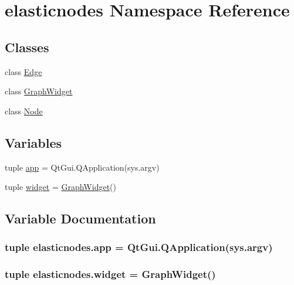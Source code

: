 \hypertarget{namespaceelasticnodes}{}\section{elasticnodes Namespace Reference}
\label{namespaceelasticnodes}
\subsection*{Classes}
\begin{DoxyCompactItemize}
\item 
class \hyperlink{classelasticnodes_1_1Edge}{Edge}
\item 
class \hyperlink{classelasticnodes_1_1GraphWidget}{Graph\+Widget}
\item 
class \hyperlink{classelasticnodes_1_1Node}{Node}
\end{DoxyCompactItemize}
\subsection*{Variables}
\begin{DoxyCompactItemize}
\item 
tuple \hyperlink{namespaceelasticnodes_a727e8c9802e0a4f5cddebc6e449352d2}{app} = Qt\+Gui.\+Q\+Application(sys.\+argv)
\item 
tuple \hyperlink{namespaceelasticnodes_a5c218638fecb87ed3cbf25946247119f}{widget} = \hyperlink{classelasticnodes_1_1GraphWidget}{Graph\+Widget}()
\end{DoxyCompactItemize}


\subsection{Variable Documentation}
\hypertarget{namespaceelasticnodes_a727e8c9802e0a4f5cddebc6e449352d2}{}
\subsubsection[{app}]{\setlength{\rightskip}{0pt plus 5cm}tuple elasticnodes.\+app = Qt\+Gui.\+Q\+Application(sys.\+argv)}\label{namespaceelasticnodes_a727e8c9802e0a4f5cddebc6e449352d2}
\hypertarget{namespaceelasticnodes_a5c218638fecb87ed3cbf25946247119f}{}
\subsubsection[{widget}]{\setlength{\rightskip}{0pt plus 5cm}tuple elasticnodes.\+widget = {\bf Graph\+Widget}()}\label{namespaceelasticnodes_a5c218638fecb87ed3cbf25946247119f}
